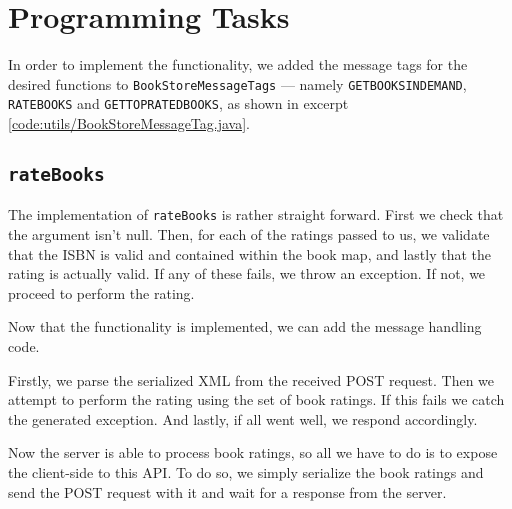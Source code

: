 
\newpage
\section{Programming Tasks}

\setlength\columnsep{30pt}
\begin{multicols}{2}
    In order to implement the functionality, we added the message tags for the
    desired functions to {\tt BookStoreMessageTags} --- namely
    {\tt GETBOOKSINDEMAND}, {\tt RATEBOOKS} and {\tt GETTOPRATEDBOOKS}, as
    shown in excerpt \ref{code:utils/BookStoreMessageTag.java}.

    \colbreak

\end{multicols}
\setlength\columnsep{10pt}

\subsection{\tt rateBooks}
The implementation of {\tt rateBooks} is rather straight forward. First we check
that the argument isn't null. Then, for each of the ratings passed to us, we
validate that the ISBN is valid and contained within the book map, and lastly
that the rating is actually valid. If any of these fails, we throw an exception.
If not, we proceed to perform the rating.

Now that the functionality is implemented, we can add the message handling code.

Firstly, we parse the serialized XML from the received POST request. Then we
attempt to perform the rating using the set of book ratings. If this fails we
catch the generated exception. And lastly, if all went well, we respond
accordingly.

Now the server is able to process book ratings, so all we have to do is to
expose the client-side to this API. To do so, we simply serialize the book
ratings and send the POST request with it and wait for a response from the
server.

